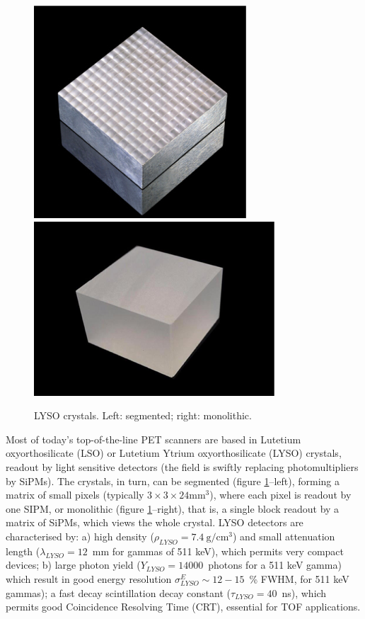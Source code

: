 \begin{figure}[!htb]
	\centering
	\includegraphics[scale=0.5]{img/LysoSegmented.png}
	\includegraphics[scale=0.6]{img/LysoMono.png}
	\caption{\label{fig.lyso} LYSO crystals. Left: segmented; right: monolithic.  }
\end{figure}

Most of today's top-of-the-line PET scanners are based in  Lutetium oxyorthosilicate (LSO) or  
Lutetium Ytrium oxyorthosilicate (LYSO) crystals, readout by light sensitive detectors (the field is swiftly replacing photomultipliers by  SiPMs). The crystals, in turn, can be segmented (figure \ref{fig.lyso}--left), forming a matrix
of small pixels (typically $3\times 3 \times 24 \mathrm{mm^3}$), where each pixel is readout by one SIPM, or monolithic (figure \ref{fig.lyso}--right), that is, a single block readout by a matrix of SiPMs, which views the whole crystal. LYSO detectors
are characterised by: a) high density ($\rho_{LYSO} =7.4~\mathrm{g/cm^3}$) and small attenuation length 
($\lambda_{LYSO} =12$~mm for gammas of 511 keV), which permits very compact devices; b) large photon yield
($Y_{LYSO} =14000$~photons for a 511 keV gamma) which result in good energy resolution 
$\sigma^E_{LYSO} \sim12-15$~\% FWHM, for 511 keV gammas); a fast decay scintillation decay constant
($\tau_{LYSO} = 40$~ns), which permits good Coincidence Resolving Time (CRT), essential for TOF applications. 

